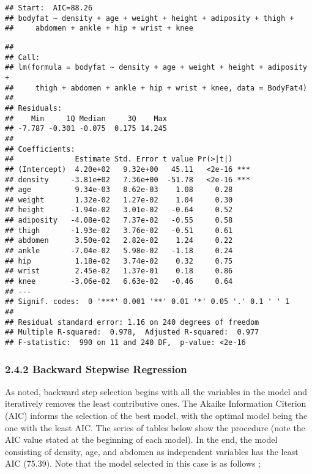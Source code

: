 \documentclass[
]{article}
\begin{document}
\begin{verbatim}
## Start:  AIC=88.26
## bodyfat ~ density + age + weight + height + adiposity + thigh + 
##     abdomen + ankle + hip + wrist + knee
\end{verbatim}

\begin{verbatim}
## 
## Call:
## lm(formula = bodyfat ~ density + age + weight + height + adiposity + 
##     thigh + abdomen + ankle + hip + wrist + knee, data = BodyFat4)
## 
## Residuals:
##    Min     1Q Median     3Q    Max 
## -7.787 -0.301 -0.075  0.175 14.245 
## 
## Coefficients:
##              Estimate Std. Error t value Pr(>|t|)    
## (Intercept)  4.20e+02   9.32e+00   45.11   <2e-16 ***
## density     -3.81e+02   7.36e+00  -51.78   <2e-16 ***
## age          9.34e-03   8.62e-03    1.08     0.28    
## weight       1.32e-02   1.27e-02    1.04     0.30    
## height      -1.94e-02   3.01e-02   -0.64     0.52    
## adiposity   -4.08e-02   7.37e-02   -0.55     0.58    
## thigh       -1.93e-02   3.76e-02   -0.51     0.61    
## abdomen      3.50e-02   2.82e-02    1.24     0.22    
## ankle       -7.04e-02   5.98e-02   -1.18     0.24    
## hip          1.18e-02   3.74e-02    0.32     0.75    
## wrist        2.45e-02   1.37e-01    0.18     0.86    
## knee        -3.06e-02   6.63e-02   -0.46     0.64    
## ---
## Signif. codes:  0 '***' 0.001 '**' 0.01 '*' 0.05 '.' 0.1 ' ' 1
## 
## Residual standard error: 1.16 on 240 degrees of freedom
## Multiple R-squared:  0.978,  Adjusted R-squared:  0.977 
## F-statistic:  990 on 11 and 240 DF,  p-value: <2e-16
\end{verbatim}

\hypertarget{backward-stepwise-regression}{%
\subsubsection{\texorpdfstring{\textbf{2.4.2 Backward Stepwise
Regression}}{2.4.2 Backward Stepwise Regression}}\label{backward-stepwise-regression}}

As noted, backward step selection begins with all the variables in the
model and iteratively removes the least contributive ones. The Akaike
Information Citerion (AIC) informs the selection of the best model, with
the optimal model being the one with the least AIC. The series of tables
below show the procedure (note the AIC value stated at the beginning of
each model). In the end, the model consisting of density, age, and
abdomen as independent variables has the least AIC (75.39). Note that
the model selected in this case is as follows ;
\end{document}
